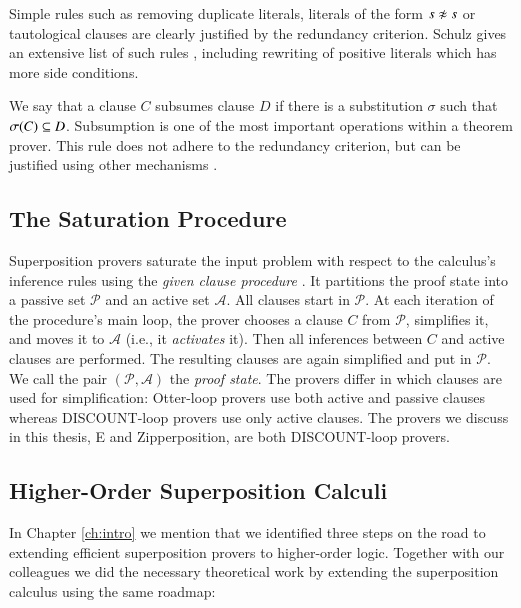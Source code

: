 Simple rules such as removing duplicate literals, literals of the form $s \noteq
s$ or tautological clauses are clearly justified by the redundancy criterion.
Schulz gives an extensive list of such rules \cite{ss-02-brainiac}, including rewriting of positive
literals which has more side conditions.

We say that a clause $C$ subsumes clause $D$ if there is a substitution $\sigma$
such that $\sigma(C) \subseteq D$. Subsumption is one of the most important
operations within a theorem prover. This rule does not adhere to the redundancy
criterion, but can be justified using other mechanisms \cite{wtrb-20-sat-framework}.

\subsection{The Saturation Procedure}
\label{sec:pre:saturation}

Superposition provers saturate the input problem with respect to the calculus's
inference rules using the \emph{given clause procedure}
\cite{mcw-1997-otter,adf-1995-discount}. It partitions the proof state into a
passive set $\mathcal{P}$ and an active set $\mathcal{A}$. All clauses start in
$\mathcal{P}$. At each iteration of the procedure's main loop, the prover
chooses a clause $C$ from $\mathcal{P}$, simplifies it, and moves it to
$\mathcal{A}$ (i.e., it \emph{activates} it). Then all inferences between $C$ and active clauses are performed.
The resulting clauses are again simplified and put in $\mathcal{P}$.
We call the pair $(\mathcal{P}, \mathcal{A})$ the \emph{proof state}.
The provers differ in which clauses are used for simplification: Otter-loop
\cite{mcw-1997-otter} provers use both active and passive clauses whereas
DISCOUNT-loop \cite{adf-1995-discount} provers use only active clauses.
The provers we discuss in this thesis, E and Zipperposition, are both DISCOUNT-loop provers.

\subsection{Higher-Order Superposition Calculi}
\label{sec:pre:ho-sup-calculi}

In Chapter \ref{ch:intro} we mention that we identified three steps on the road
to extending efficient superposition provers to higher-order logic. Together with
our colleagues we did the necessary theoretical work by extending the superposition
calculus using the same roadmap:

